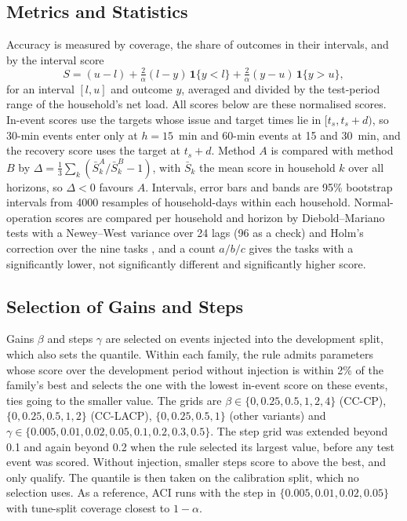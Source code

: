 \documentclass[conference,a4paper]{IEEEtran}
\begin{document}
\subsection{Metrics and Statistics}
Accuracy is measured by coverage, the share of outcomes in their intervals, and by the interval score
\cite[eq.~(43)]{gneiting}
\begin{equation}
S=(u-l)+\tfrac{2}{\alpha}(l-y)\,\mathbf{1}\{y<l\}+\tfrac{2}{\alpha}(y-u)\,\mathbf{1}\{y>u\}, \label{eq:is}
\end{equation}
for an interval $[l,u]$ and outcome $y$, averaged and divided by the test-period range of the household's net load. All scores
below are these normalised scores. In-event scores use the targets whose issue and target times lie in $[t_s,t_s+d)$, so 30-min events enter
only at $h=15$~min and 60-min events at 15 and 30~min, and the recovery score uses the target at $t_s+d$. Method $A$ is compared with method $B$ by $\Delta=\frac{1}{3}\sum_{k}(\bar S^A_k/\bar S^B_k-1)$, with
$\bar S_k$ the mean score in household $k$ over all horizons, so $\Delta<0$ favours $A$. Intervals, error bars and bands are 95\% bootstrap intervals from
4000 resamples of household-days within each household. Normal-operation scores are compared per household and horizon by Diebold--Mariano tests
\cite[Sec.~2.1]{diebold} with a Newey--West variance \cite[eq.~(5)]{newey} over 24 lags (96 as a check) and Holm's
correction over the nine tasks \cite{holm}, and a count $a/b/c$ gives the tasks with a significantly lower, not
significantly different and significantly higher score.

\subsection{Selection of Gains and Steps}
Gains $\beta$ and steps $\gamma$ are selected on \nDev{} events injected into the development split,
which also sets the quantile.
Within each family, the rule admits parameters whose score over the development period without injection is
within 2\% of the family's best and selects the one with the lowest in-event score on these events, ties
going to the smaller value. The grids are
$\beta\in\{0,0.25,0.5,1,2,4\}$ (CC-CP), $\{0,0.25,0.5,1,2\}$ (CC-LACP), $\{0,0.25,0.5,1\}$ (other variants) and
$\gamma\in\{0.005,0.01,0.02,0.05,0.1,0.2,0.3,0.5\}$. The step grid was extended beyond 0.1 and again beyond 0.2
when the rule selected its largest value, before any test event was scored. Without injection, smaller
steps score \devACIlowMin{} to \devACIlowMax{} above the best, and only \devACIadm{} qualify. The quantile is then taken on
the calibration split, which no selection uses. As a reference, ACI runs with the step in
$\{0.005,0.01,0.02,0.05\}$ with tune-split coverage closest to $1-\alpha$.
\end{document}

